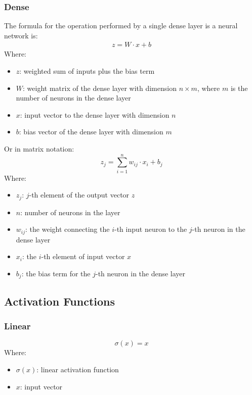 \documentclass[a4paper]{article}
\begin{document}
\subsubsection*{Dense}
The formula for the operation performed by a single dense layer is a neural network is:
\begin{align*}
    z = W \cdot x + b
\end{align*}
Where:
\begin{itemize}
    \item $z$: weighted sum of inputs plus the bias term
    \item $W$: weight matrix of the dense layer with dimension $n \times m$, where $m$ is the number of neurons in the dense layer
    \item $x$: input vector to the dense layer with dimension $n$
    \item $b$: bias vector of the dense layer with dimension $m$
\end{itemize}

Or in matrix notation:
\begin{equation*}
    z_j = \sum_{i=1}^{n} w_{ij} \cdot x_i + b_j
\end{equation*}
Where:
\begin{itemize}
    \item $z_j$: $j$-th element of the output vector $z$
    \item $n$: number of neurons in the layer
    \item $w_{ij}$: the weight connecting the $i$-th input neuron to the $j$-th neuron in the dense layer
    \item $x_i$: the $i$-th element of input vector $x$
    \item $b_j$: the bias term for the $j$-th neuron in the dense layer
\end{itemize}

\subsection*{Activation Functions}
\subsubsection*{Linear}
\begin{equation*}
    \sigma(x) = x
\end{equation*}
Where:
\begin{itemize}
    \item $\sigma(x)$: linear activation function
    \item $x$: input vector
\end{itemize}
\end{document}
